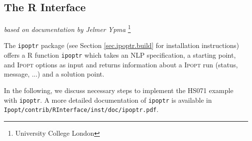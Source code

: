 \documentclass[10pt]{article}
\newcommand{\Ipopt}{\textsc{Ipopt}\xspace}
\newcommand{\ipoptr}{\texttt{ipoptr}\xspace}
\begin{document}
\subsection{The R Interface} 
\hfill \textit{based on documentation by Jelmer Ypma}%
\footnote{University College London}
\medskip

The \ipoptr package (see Section \ref{sec.ipoptr.build} for installation 
instructions) offers a R function {\tt ipoptr} which takes an NLP 
specification, a starting point, and \Ipopt options as input and returns 
information about a \Ipopt run (status, message, ...) and a solution point.

In the following, we discuss necessary steps to implement the HS071 example 
with \ipoptr.
A more detailed documentation of \ipoptr is available in
{\tt Ipopt/contrib/RInterface/inst/doc/ipoptr.pdf}.
\end{document}
